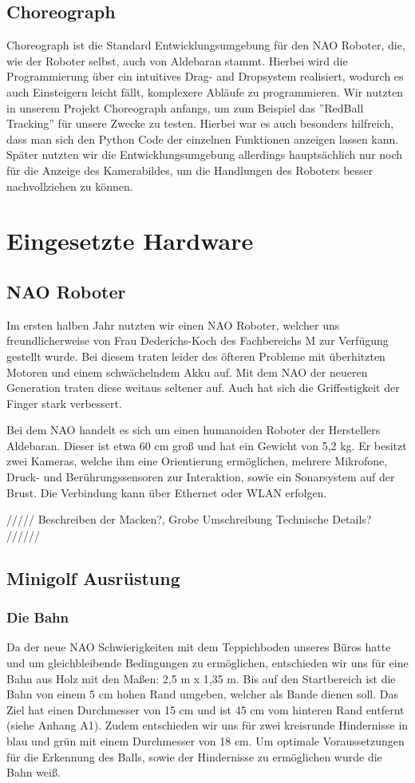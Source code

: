 \documentclass{scrartcl}
\begin{document}
\subsection{Choreograph}
Choreograph ist die Standard Entwicklungsumgebung für den NAO Roboter, die, wie der Roboter selbst, auch von Aldebaran stammt. Hierbei wird die Programmierung über ein intuitives Drag- and Dropsystem realisiert, wodurch es auch Einsteigern leicht fällt, komplexere Abläufe zu programmieren. Wir nutzten in unserem Projekt Choreograph anfangs, um zum Beispiel das ''RedBall Tracking'' für unsere Zwecke zu testen. Hierbei war es auch besonders hilfreich, dass man sich den Python Code der einzelnen Funktionen anzeigen lassen kann. Später nutzten wir die Entwicklungsumgebung allerdings hauptsächlich nur noch für die Anzeige des Kamerabildes, um die Handlungen des Roboters besser nachvollziehen zu können.

\section{Eingesetzte Hardware}

\subsection{NAO Roboter}
Im ersten halben Jahr nutzten wir einen NAO Roboter, welcher uns freundlicherweise von Frau Dederichs-Koch des Fachbereichs M zur Verfügung gestellt wurde. Bei diesem traten leider des öfteren Probleme mit überhitzten Motoren und einem schwächelndem Akku auf.  
Mit dem NAO der neueren Generation traten diese weitaus seltener auf. Auch hat sich die Griffestigkeit der Finger stark verbessert.

Bei dem NAO handelt es sich um einen humanoiden Roboter der Herstellers Aldebaran.
Dieser ist etwa 60 cm groß und hat ein Gewicht von 5,2 kg. Er besitzt zwei Kameras, welche ihm eine Orientierung ermöglichen,  mehrere Mikrofone, Druck- und Berührungssensoren zur Interaktion, sowie ein Sonarsystem auf der Brust. Die Verbindung kann über Ethernet oder WLAN erfolgen. 

///// Beschreiben der Macken?, Grobe Umschreibung Technische Details? //////

\subsection{Minigolf Ausrüstung}

\subsubsection{Die Bahn}
Da der neue NAO Schwierigkeiten mit dem Teppichboden unseres Büros hatte und um gleichbleibende Bedingungen zu ermöglichen, entschieden wir uns für eine Bahn aus Holz mit den Maßen: 2,5 m x 1,35 m. Bis auf den Startbereich ist die Bahn von einem 5 cm hohen Rand umgeben, welcher als Bande dienen soll. Das Ziel hat einen Durchmesser von 15 cm und ist 45 cm vom hinteren Rand entfernt (siehe Anhang A1). Zudem entschieden wir uns für zwei kreisrunde Hindernisse in blau und grün mit einem Durchmesser von 18 cm. Um  optimale Voraussetzungen für die Erkennung des Balls, sowie der Hindernisse zu ermöglichen wurde die Bahn weiß.
\end{document}
